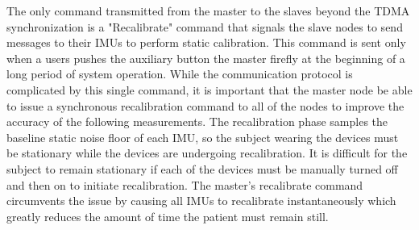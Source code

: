 \documentclass[conference]{IEEEtran}
\begin{document}
The only command transmitted from the master to the slaves beyond the TDMA synchronization
is a "Recalibrate" command that signals the slave nodes to send messages to their IMUs to
perform static calibration. This command is sent only when a users pushes the auxiliary
button the master firefly at the beginning of a long period of system operation. While the
communication protocol is complicated by this single command, it is important that the
master node be able to issue a synchronous recalibration command to all of the nodes to
improve the accuracy of the following measurements. The recalibration phase samples the
baseline static noise floor of each IMU, so the subject wearing the devices must be
stationary while the devices are undergoing recalibration. It is difficult for the subject
to remain stationary if each of the devices must be manually turned off and then on to initiate
recalibration. The master's recalibrate command circumvents the issue by causing all IMUs
to recalibrate instantaneously which greatly reduces the amount of time the patient must
remain still. 
\end{document}
